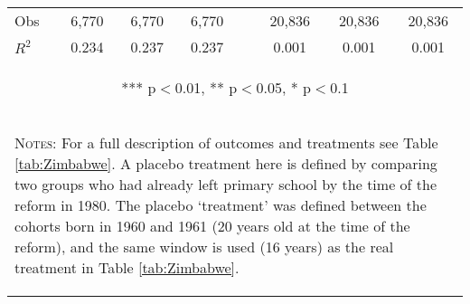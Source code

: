 \begin{subtables}
\begin{landscape}
\begin{table}[htpb!]
\begin{center}
\begin{tabular}{lcccp{0.3cm}ccc}
Obs	&	6,770	&	6,770	&	6,770	&&	20,836	&	20,836	&	20,836	\\	
$R^2$	&	0.234	&	0.237	&	0.237	&&	0.001	&	0.001	&	0.001	\\ \midrule	
\multicolumn{8}{c}{\begin{footnotesize} *** p$<$0.01, ** p$<$0.05, * p$<$0.1\end{footnotesize}} \\														
\multicolumn{8}{p{15cm}}{\begin{footnotesize}\textsc{Notes:} For a full description of outcomes and treatments see Table \ref{tab:Zimbabwe}. A placebo treatment here is defined by comparing two groups who had already left primary school by the time of the reform in 1980.  The placebo `treatment' was defined between the cohorts born in 1960 and 1961 (20 years old at the time of the reform), and the same window is used (16 years) as the real treatment in Table \ref{tab:Zimbabwe}. \end{footnotesize}} \\
\bottomrule														
\end{tabular}														
\end{center}														
\end{table}														
\end{landscape}														


\end{subtables}
